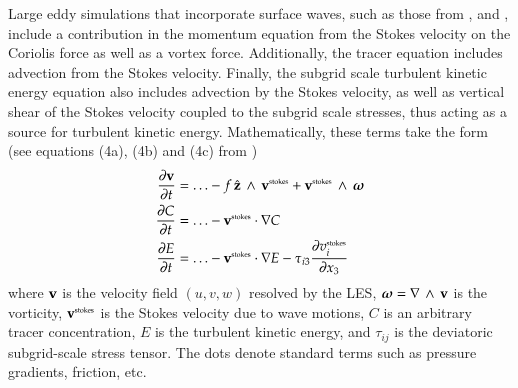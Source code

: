 Large eddy simulations that incorporate surface waves, such as those
from \cite{McWilliamsSullivanMoeng1997}, \cite{McWilliamsSullivan2001}
and \cite{SullivanMcWilliams07}, include a contribution in the
momentum equation from the Stokes velocity on the Coriolis force as
well as a vortex force.  Additionally, the tracer equation includes
advection from the Stokes velocity.  Finally, the subgrid scale
turbulent kinetic energy equation also includes advection by the
Stokes velocity, as well as vertical shear of the Stokes velocity
coupled to the subgrid scale stresses, thus acting as a source for
turbulent kinetic energy. Mathematically, these terms take the form
(see equations (4a), (4b) and (4c) from \cite{SullivanMcWilliams2010})
\begin{align}
\frac{\partial {\bf v}}{\partial t} &= \ldots -f \, \hat{\bf z} \, \wedge \, {\bf v}^{\mbox{\tiny stokes}}  
 + {\bf v}^{\mbox{\tiny stokes}}  \, \wedge \, \mbox{\boldmath $\omega$}
\\
\frac{\partial C}{\partial t} &= \ldots -{\bf v}^{\mbox{\tiny stokes}} \cdot \nabla C
\\
\frac{\partial E}{\partial t} &= \ldots -{\bf v}^{\mbox{\tiny stokes}} \cdot \nabla E
 - \tau_{i3} \frac{\partial v^{\mbox{\tiny stokes}}_{i}}{\partial x_{3}}
\end{align}
where ${\bf v}$ is the velocity field $(u,v,w)$ resolved by the LES,
$\mbox{\boldmath $\omega$} = \nabla \, \wedge \, {\bf v}$ is the vorticity, ${\bf
  v}^{\mbox{\tiny stokes}}$ is the Stokes velocity due to wave
motions, $C$ is an arbitrary tracer concentration, $E$ is the
turbulent kinetic energy, and $\tau_{ij}$ is the deviatoric
subgrid-scale stress tensor. The dots denote standard terms such as
pressure gradients, friction, etc.

